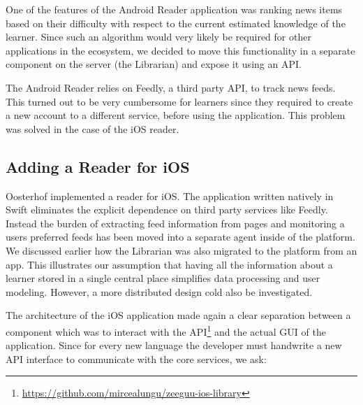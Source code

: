 
One of the features of the Android Reader application was ranking news items based on their difficulty with respect to the current estimated knowledge of the learner. Since such an algorithm would very likely be required for other applications in the ecosystem, we decided to move this functionality in a separate component on the server (the Librarian) and expose it using an API. 

The Android Reader relies on Feedly, a third party API, to track news feeds. This turned out to be very cumbersome for learners since they required to create a new account to a different service, before using the application. This problem was solved in the case of the iOS reader.

\subsection {Adding a Reader for iOS}


Oosterhof \cite{Oost16reading} implemented a reader for iOS. The application written natively in Swift eliminates the explicit dependence on third party services like Feedly. Instead the burden of extracting feed information from pages and monitoring a users preferred feeds has been moved into a separate agent inside of the platform. We discussed earlier how the Librarian was also migrated to the platform from an app. This illustrates our assumption that having all the information about a learner stored in a single central place simplifies data processing and user modeling. However, a more distributed design cold also be investigated.



The architecture of the iOS application made again a clear separation between a component which was to interact with the API\footnote{\url{https://github.com/mircealungu/zeeguu-ios-library}} and the actual GUI of the application. Since for every new language the developer must handwrite a new API interface to  communicate with the core services, we ask: 


